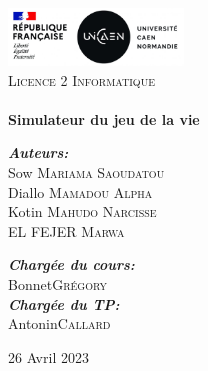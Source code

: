\begin{titlepage}
\begin{center}


\includegraphics[width=0.35\textwidth]{images/logo}~\\[1cm]

\textsc{\LARGE Licence 2 Informatique}\\[1.5cm]

\textsc{\Large }\\[0.5cm]


{\huge \bfseries Simulateur du jeu de la vie\\[0.4cm] }


\begin{minipage}{0.4\textwidth}
\begin{flushleft} \large
\emph{\bfseries Auteurs:}\\
Sow \textsc{Mariama Saoudatou}\\
Diallo \textsc{Mamadou Alpha}\\
Kotin \textsc{Mahudo Narcisse}\\
EL FEJER \textsc{Marwa}\\
\end{flushleft}
\end{minipage}
\begin{minipage}{0.4\textwidth}
\begin{flushright} \large
\emph{\bfseries Chargée du cours:} \\
Bonnet\textsc{Grégory}\\
\emph{\bfseries Chargée du TP:} \\
 Antonin\textsc{Callard}\\
\end{flushright}
\end{minipage}

\vfill

{\large 26 Avril 2023}

\end{center}
\end{titlepage}
